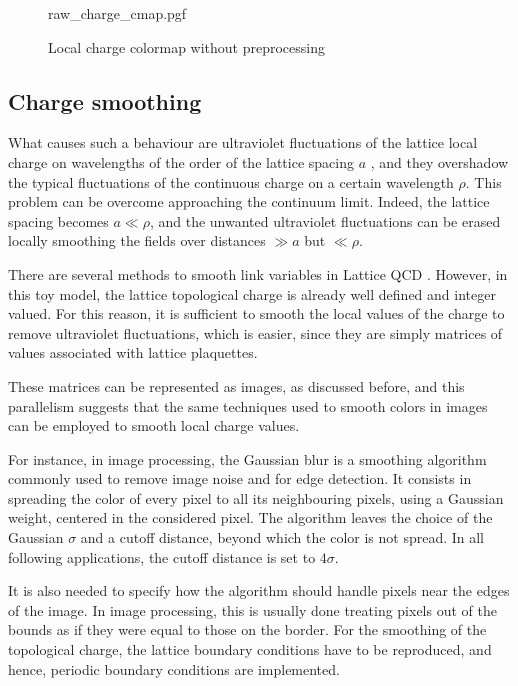 \begin{figure}[!htb]
	\centering
    {raw_charge_cmap.pgf}
    \caption{Local charge colormap without preprocessing}
    \label{fig:raw_charge_cmap}
\end{figure}

\subsection*{Charge smoothing}

What causes such a behaviour are ultraviolet fluctuations of the lattice local charge on wavelengths of the order of the lattice spacing $a$ \cite{teper:1985},
and they overshadow the typical fluctuations of the continuous charge on a certain wavelength $\rho$. 
This problem can be overcome approaching the continuum limit. Indeed, the lattice spacing becomes $a\ll\rho$,
and the unwanted ultraviolet fluctuations can be erased locally smoothing the fields over distances $\gg a$ but $\ll \rho$.

There are several methods to smooth link variables in Lattice QCD \cite{alexandrou:2017}.
However, in this toy model, the lattice topological charge is already well defined and integer valued.
For this reason, it is sufficient to smooth the local values of the charge to remove ultraviolet fluctuations,
which is easier, since they are simply matrices of values associated with lattice plaquettes.

These matrices can be represented as images, as discussed before,
and this parallelism suggests that the same techniques used to smooth colors in images can be employed to smooth local charge values.

For instance, in image processing, the Gaussian blur is a smoothing algorithm commonly used to remove image noise and for edge detection.
It consists in spreading the color of every pixel to all its neighbouring pixels, using a Gaussian weight, centered in the considered pixel.
The algorithm leaves the choice of the Gaussian $\sigma$ and a cutoff distance, beyond which the color is not spread.
In all following applications, the cutoff distance is set to $4\sigma$.

It is also needed to specify how the algorithm should handle pixels near the edges of the image.
In image processing, this is usually done treating pixels out of the bounds as if they were equal to those on the border.
For the smoothing of the topological charge, the lattice boundary conditions have to be reproduced,
and hence, periodic boundary conditions are implemented.

